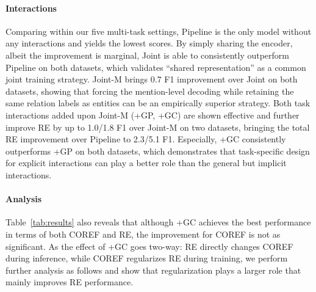 \documentclass[11pt]{article}
\begin{document}
\paragraph{Interactions}
Comparing within our five multi-task settings, Pipeline is the only model without any interactions and yields the lowest scores. By simply sharing the encoder, albeit the improvement is marginal, Joint is able to consistently outperform Pipeline on both datasets, which validates ``shared representation'' as a common joint training strategy.
Joint-M brings 0.7 F1 improvement over Joint on both datasets, showing that forcing the mention-level decoding while retaining the same relation labels as entities can be an empirically superior strategy.
Both task interactions added upon Joint-M (+GP, +GC) are shown effective and further improve RE by up to 1.0/1.8 F1 over Joint-M on two datasets, bringing the total RE improvement over Pipeline to 2.3/5.1 F1. Especially, +GC consistently outperforms +GP on both datasets, which demonstrates that task-specific design for explicit interactions can play a better role than the general but implicit interactions.

\paragraph{Analysis}
Table~\ref{tab:results} also reveals that although +GC achieves the best performance in terms of both COREF and RE, the improvement for COREF is not as significant. As the effect of +GC goes two-way: RE directly changes COREF during inference, while COREF regularizes RE during training, we perform further analysis as follows and show that regularization plays a larger role that mainly improves RE performance.

\begin{table}[tbp!]
\centering
{}
\caption{Deltas of performance on the test set of DWIE applying +GC upon Joint-M. COREF and RE are evaluated separately (RE are given gold entities at evaluation). P/R/F is the precision/recall/F1 score.}
\label{tab:delta}
\vspace{-1.5ex}
\end{table}
\end{document}
